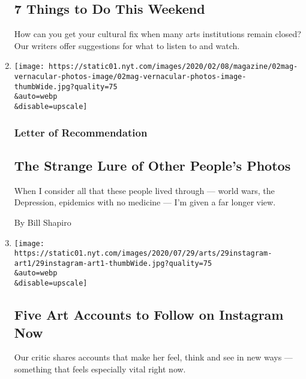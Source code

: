 \begin{enumerate}
  \hypertarget{7-things-to-do-this-weekend}{%
  \subsection{7 Things to Do This
  Weekend}\label{7-things-to-do-this-weekend}}

  How can you get your cultural fix when many arts institutions remain
  closed? Our writers offer suggestions for what to listen to and watch.
\item
  \href{/2020/07/30/magazine/the-strange-lure-of-other-peoples-photos.html}{}

  \texttt{[image: https://static01.nyt.com/images/2020/02/08/magazine/02mag-vernacular-photos-image/02mag-vernacular-photos-image-thumbWide.jpg?quality=75\\\&auto=webp\\\&disable=upscale]}

  \hypertarget{letter-of-recommendation}{%
  \subsubsection{Letter of
  Recommendation}\label{letter-of-recommendation}}

  \hypertarget{the-strange-lure-of-other-peoples-photos}{%
  \subsection{The Strange Lure of Other People's
  Photos}\label{the-strange-lure-of-other-peoples-photos}}

  When I consider all that these people lived through --- world wars,
  the Depression, epidemics with no medicine --- I'm given a far longer
  view.

  By Bill Shapiro
\item
  \href{/2020/07/29/arts/design/art-accounts-to-follow-instagram.html}{}

  \texttt{[image: https://static01.nyt.com/images/2020/07/29/arts/29instagram-art1/29instagram-art1-thumbWide.jpg?quality=75\\\&auto=webp\\\&disable=upscale]}

  \hypertarget{five-art-accounts-to-follow-on-instagram-now}{%
  \subsection{Five Art Accounts to Follow on Instagram
  Now}\label{five-art-accounts-to-follow-on-instagram-now}}

  Our critic shares accounts that make her feel, think and see in new
  ways --- something that feels especially vital right now.


\end{enumerate}
